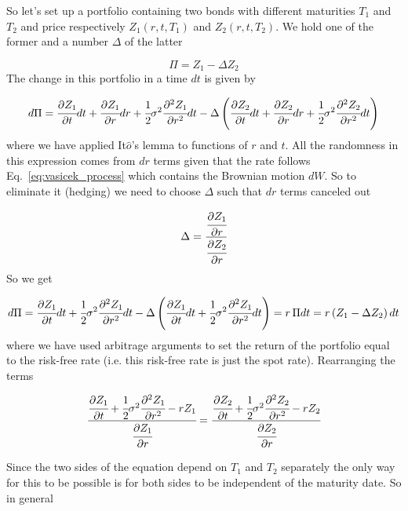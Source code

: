 So let's set up a portfolio containing two bonds with different maturities $T_1$ and $T_2$ and price respectively $Z_1(r, t, T_1)$
and $Z_2(r, t, T_2)$. We hold one of the former and a number $\Delta$ of the latter

\begin{equation*}
	\Pi = Z_1-\Delta Z_2
\end{equation*}
The change in this portfolio in a time $dt$ is given by

\begin{equation*}
	d\Pi = \cfrac{\partial Z_1}{\partial t}dt + \cfrac{\partial Z_1}{\partial r}dr + \cfrac{1}{2}\sigma^2 \cfrac{\partial^2 Z_1}{\partial r^2}dt - \Delta\left(\cfrac{\partial Z_2}{\partial t}dt + \cfrac{\partial Z_2}{\partial r}dr + \cfrac{1}{2}\sigma^2 \cfrac{\partial^2 Z_2}{\partial r^2}dt\right)
\end{equation*}
where we have applied It$\hat{o}$'s lemma to functions of $r$ and $t$. All the randomness in this expression comes from $dr$ terms given that the rate follows Eq.~\ref{eq:vasicek_process} which contains the Brownian motion $dW$. So to eliminate it (hedging) we need to choose $\Delta$ such that $dr$ terms canceled out

\begin{equation*}
	\Delta = \cfrac{\cfrac{\partial Z_1}{\partial r}}{\cfrac{\partial Z_2}{\partial r}}
\end{equation*}
So we get

\begin{equation*}
	d\Pi = \cfrac{\partial Z_1}{\partial t}dt + \cfrac{1}{2}\sigma^2 \cfrac{\partial^2 Z_1}{\partial r^2}dt - \Delta\left(\cfrac{\partial Z_1}{\partial t}dt + \cfrac{1}{2}\sigma^2 \cfrac{\partial^2 Z_1}{\partial r^2}dt\right) = r\, \Pi dt = r \left(Z_1 - \Delta Z_2\right)dt
\end{equation*}
where we have used arbitrage arguments to set the return of the portfolio equal to the risk-free rate (i.e. this risk-free rate is just the spot rate). Rearranging the terms

\begin{equation*}
	\cfrac{\cfrac{\partial Z_1}{\partial t} + \cfrac{1}{2}\sigma^2 \cfrac{\partial^2 Z_1}{\partial r^2} - rZ_1}{\cfrac{\partial Z_1}{\partial r}}=\cfrac{\cfrac{\partial Z_2}{\partial t} + \cfrac{1}{2}\sigma^2 \cfrac{\partial^2 Z_2}{\partial r^2} - rZ_2}{\cfrac{\partial Z_2}{\partial r}}
\end{equation*}

Since the two sides of the equation depend on $T_1$ and $T_2$ separately the only way for this to be possible is for both sides to be independent of the maturity date. So in general

